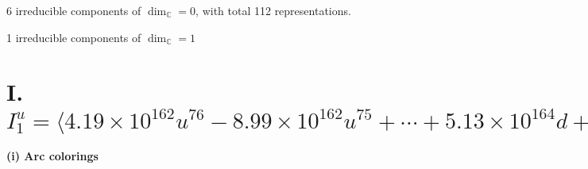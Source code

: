 \documentclass[1p]{elsarticle_modified}
\theoremstyle{definition}
\begin{document}
\raggedright * 6 irreducible components of $\dim_{\mathbb{C}}=0$, with total 112 representations.\\
\raggedright * 1 irreducible components of $\dim_{\mathbb{C}}=1$ \\
\newpage
\renewcommand{\arraystretch}{1}
\centering \section*{I. $I^u_{1}= \langle 4.19\times10^{162} u^{76}-8.99\times10^{162} u^{75}+\cdots+5.13\times10^{164} d+1.75\times10^{165},\;5.20\times10^{162} u^{76}-1.09\times10^{163} u^{75}+\cdots+5.13\times10^{164} c+2.30\times10^{165},\;5.03\times10^{182} u^{76}-1.23\times10^{183} u^{75}+\cdots+1.09\times10^{185} b+3.36\times10^{185},\;-3.62\times10^{182} u^{76}+6.18\times10^{182} u^{75}+\cdots+5.44\times10^{184} a-1.84\times10^{184},\;u^{77}-2 u^{76}+\cdots-2560 u^2-512 \rangle$}
\flushleft \textbf{(i) Arc colorings}\\
\end{document}
